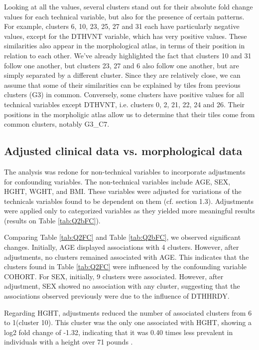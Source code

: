 \documentclass[a4paper, 11pt]{article}
\begin{document}
\begin{multicols}{2}
Looking at all the values, several clusters stand out for their absolute fold change values for each technical variable, but also for the presence of certain patterns. For example, clusters 6, 10, 23, 25, 27 and 31 each have particularly negative values, except for the DTHVNT variable, which has very positive values. These similarities also appear in the morphological atlas, in terms of their position in relation to each other. We've already highlighted the fact that clusters 10 and 31 follow one another, but clusters 23, 27 and 6 also follow one another, but are simply separated by a different cluster. Since they are relatively close, we can assume that some of their similarities can be explained by tiles from previous clusters (G3) in common. Conversely, some clusters have positive values for all technical variables except DTHVNT, i.e. clusters 0, 2, 21, 22, 24 and 26. Their positions in the morpholigic atlas allow us to determine that their tiles come from common clusters, notably G3\_C7.

\subsection{Adjusted clinical data vs. morphological data}

The analysis was redone for non-technical variables to incorporate adjustments for confounding variables. The non-technical variables include AGE, SEX, HGHT, WGHT, and BMI. These variables were adjusted for variations  of the technicals variables found to be dependent on them (cf. section 1.3). 
Adjustments were applied only to categorized variables as they yielded more meaningful results (results on Table \ref{tab:Q2bFC}).

Comparing Table \ref{tab:Q2FC} and Table \ref{tab:Q2bFC}, we observed significant changes. Initially, AGE displayed associations with 4 clusters. However, after adjustments, no clusters remained associated with AGE. This indicates that the clusters found in Table \ref{tab:Q2FC} were influenced by the confounding variable COHORT.
For SEX, initially, 9 clusters were associated. However, after adjustment, SEX showed no association with any cluster, suggesting that the associations observed previously were due to the influence of DTHHRDY.

Regarding HGHT, adjustments reduced the number of associated clusters from 6 to 1(cluster 10). This cluster was the only one associated with HGHT, showing a log2 fold change of -1.32, indicating that it was 0.40 times less prevalent in individuals with a height over 71 pounds . 


\end{multicols}
\end{document}
